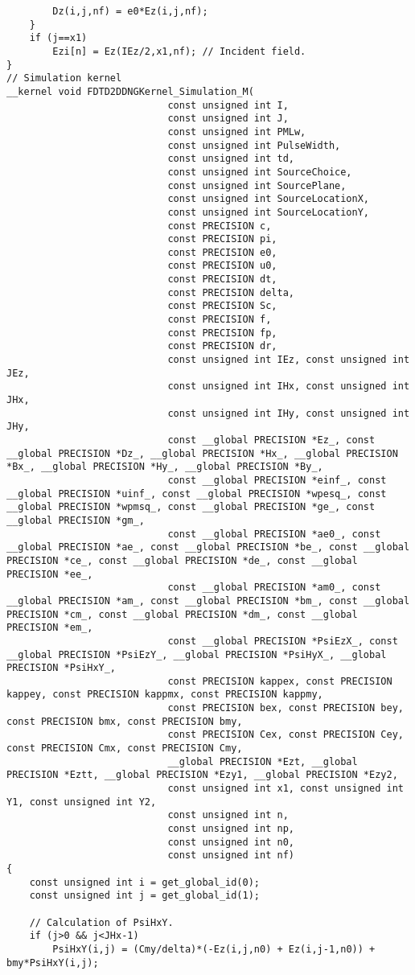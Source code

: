 \begin{lstlisting}
		Dz(i,j,nf) = e0*Ez(i,j,nf);
	}
	if (j==x1)
		Ezi[n] = Ez(IEz/2,x1,nf); // Incident field.
}
// Simulation kernel
__kernel void FDTD2DDNGKernel_Simulation_M(
							const unsigned int I,
							const unsigned int J,
							const unsigned int PMLw,
							const unsigned int PulseWidth,
							const unsigned int td,
							const unsigned int SourceChoice,
							const unsigned int SourcePlane,
							const unsigned int SourceLocationX,
							const unsigned int SourceLocationY,
							const PRECISION c,
							const PRECISION pi,
							const PRECISION e0,
							const PRECISION u0,
							const PRECISION dt,
							const PRECISION delta,
							const PRECISION Sc,
							const PRECISION f,
							const PRECISION fp,
							const PRECISION dr,
							const unsigned int IEz, const unsigned int JEz,
							const unsigned int IHx, const unsigned int JHx,
							const unsigned int IHy, const unsigned int JHy,
							const __global PRECISION *Ez_, const __global PRECISION *Dz_, __global PRECISION *Hx_, __global PRECISION *Bx_, __global PRECISION *Hy_, __global PRECISION *By_,
							const __global PRECISION *einf_, const __global PRECISION *uinf_, const __global PRECISION *wpesq_, const __global PRECISION *wpmsq_, const __global PRECISION *ge_, const __global PRECISION *gm_,
							const __global PRECISION *ae0_, const __global PRECISION *ae_, const __global PRECISION *be_, const __global PRECISION *ce_, const __global PRECISION *de_, const __global PRECISION *ee_,
							const __global PRECISION *am0_, const __global PRECISION *am_, const __global PRECISION *bm_, const __global PRECISION *cm_, const __global PRECISION *dm_, const __global PRECISION *em_,
							const __global PRECISION *PsiEzX_, const __global PRECISION *PsiEzY_, __global PRECISION *PsiHyX_, __global PRECISION *PsiHxY_,
							const PRECISION kappex, const PRECISION kappey, const PRECISION kappmx, const PRECISION kappmy,
							const PRECISION bex, const PRECISION bey, const PRECISION bmx, const PRECISION bmy,
							const PRECISION Cex, const PRECISION Cey, const PRECISION Cmx, const PRECISION Cmy,
							__global PRECISION *Ezt, __global PRECISION *Eztt, __global PRECISION *Ezy1, __global PRECISION *Ezy2,
							const unsigned int x1, const unsigned int Y1, const unsigned int Y2,
							const unsigned int n,
							const unsigned int np,
							const unsigned int n0,
							const unsigned int nf)
{
	const unsigned int i = get_global_id(0);
	const unsigned int j = get_global_id(1);

	// Calculation of PsiHxY.
	if (j>0 && j<JHx-1)
		PsiHxY(i,j) = (Cmy/delta)*(-Ez(i,j,n0) + Ez(i,j-1,n0)) + bmy*PsiHxY(i,j);


\end{lstlisting}
